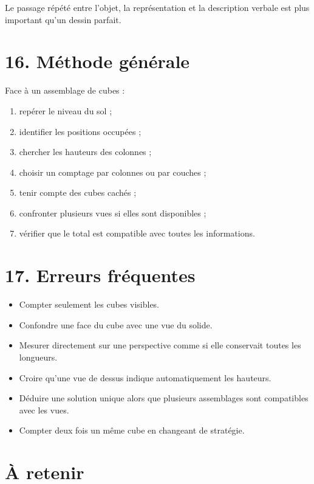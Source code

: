 Le passage répété entre l'objet, la représentation et la description verbale est plus important qu'un dessin parfait.

\section{16. Méthode générale}

\begin{methode}
Face à un assemblage de cubes :
\begin{enumerate}
\item repérer le niveau du sol ;
\item identifier les positions occupées ;
\item chercher les hauteurs des colonnes ;
\item choisir un comptage par colonnes ou par couches ;
\item tenir compte des cubes cachés ;
\item confronter plusieurs vues si elles sont disponibles ;
\item vérifier que le total est compatible avec toutes les informations.
\end{enumerate}
\end{methode}

\section{17. Erreurs fréquentes}

\begin{itemize}
\item Compter seulement les cubes visibles.
\item Confondre une face du cube avec une vue du solide.
\item Mesurer directement sur une perspective comme si elle conservait toutes les longueurs.
\item Croire qu'une vue de dessus indique automatiquement les hauteurs.
\item Déduire une solution unique alors que plusieurs assemblages sont compatibles avec les vues.
\item Compter deux fois un même cube en changeant de stratégie.
\end{itemize}

\section{À retenir}

